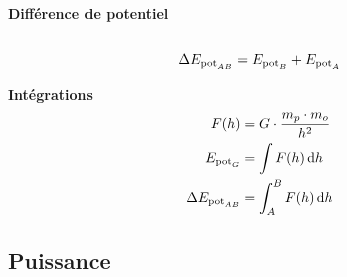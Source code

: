 \documentclass[12pt,a4paper]{article} %
\newcommand\frametitle[1]{ {\bfseries #1} \\[5pt] }
\newcommand\integrate[2][x]{\int #2 \,\mathrm{d}#1}
\newcommand\integratediff[4][x]{\int_{#2}^{#3} #4 \,\mathrm{d}#1}
\begin{document}
\vspace{1em}
\frametitle{Différence de potentiel} \\
\[\Delta E_{\text{pot}_{AB}} = E_{\text{pot}_{B}} + E_{\text{pot}_{A}}\]

\vspace{1em}
\frametitle{Intégrations}
\begin{align*}
	F(h) &= G \cdot \frac{m_p \cdot m_o}{h^2} \\
	\epotx{G} &= \integrate[h]{F(h)} \\
	\Delta\epotx{AB} &= \integratediff[h]{A}{B}{F(h)} \\
\end{align*}

\newpage

\subsection{Puissance}
\end{document}
